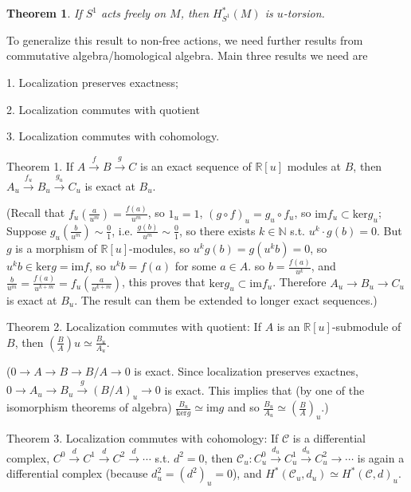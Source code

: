 \documentclass{article}
\theoremstyle{mystyle}
\newtheorem*{theorem*}{Theorem}
\theoremstyle{remark}
\numberwithin{equation}{section}
\begin{document}
\begin{theorem*} If $S^1$ acts freely on $M$, then $H^*_{S^1}(M)$ is $u$-torsion.
\end{theorem*}


To generalize this result to non-free actions, we need further results from commutative algebra/homological algebra. Main three results we need are

1. Localization preserves exactness;

2. Localization commutes with quotient

3. Localization commutes with cohomology.


Theorem 1. If $A\xrightarrow{f} B\xrightarrow{g} C$ is an exact sequence of $\mathbb{R}[u]$ modules at $B$, then $A_u\xrightarrow{f_u}B_u \xrightarrow{g_u}C_u$ is exact at $B_u$. 


(Recall that $f_u(\frac{a}{u^m}) = \frac{f(a)}{u^m}$, so $1_u = 1$, $(g\circ f)_u = g_u\circ f_u$, so $\mathrm{im}f_u \subset \mathrm{ker}g_u$; Suppose $g_u(\frac{b}{u^m}) \sim \frac{0}{1}$, i.e. $\frac{g(b)}{u^m}\sim \frac{0}{1}$, so there exists $k\in \mathbb{N}$ s.t. $u^k\cdot g(b)=0$. But $g$ is a morphism of $\mathbb{R}[u]$-modules, so $u^kg(b) = g(u^kb)=0$, so $u^kb \in \mathrm{ker} g = \mathrm{im} f$, so $u^kb = f(a)$ for some $a \in A$. so $b = \frac{f(a)}{u^k}$, and $\frac{b}{u^m} = \frac{f(a)}{u^{k+m}} = f_u(\frac{a}{u^{k+m}})$, this proves that $\mathrm{ker} g_u \subset \mathrm{im}f_u$. Therefore $A_u\rightarrow B_u\rightarrow C_u$ is exact at $B_u$. The result can them be extended to longer exact sequences.)









Theorem 2. Localization commutes with quotient: If $A$ is an $\mathbb{R}[u]$-submodule of $B$, then $\left(\frac{B}{A}\right)u \simeq \frac{B_u}{A_u}$.

($0\rightarrow A\rightarrow B\rightarrow B/A\rightarrow 0$ is exact. Since localization preserves exactnes, $0\rightarrow A_u\rightarrow B_u\xrightarrow{g} (B/A)_u\rightarrow 0$ is exact. This implies that (by one of the isomorphism theorems of algebra) $\frac{B_u}{\mathrm{ker} g} \simeq \mathrm{im}g$ and so $\frac{B_u}{A_u} \simeq \left(\frac{B}A{}\right)_u$.)

Theorem 3. Localization commutes with cohomology: If $\mathcal{C}$ is a differential complex, $C^0\xrightarrow{d} C^1\xrightarrow{d} C^2\xrightarrow{d} \cdots$ s.t. $d^2=0$, then $\mathcal{C}_u\colon C^0_u\xrightarrow{d_u} C^1_u \xrightarrow{d_u} C^2_u\rightarrow \cdots$ is again a differential complex (because $d_u^2 = (d^2)_u = 0$), and $H^*(\mathcal{C}_u,d_u) \simeq H^*(\mathcal{C},d)_u$.
\end{document}
